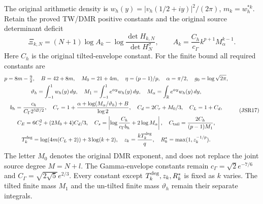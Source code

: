 \documentclass[11pt,a4paper]{article}
\newcommand{\R}{\mathbb R}
\begin{document}
The original arithmetic density is
$w_h(y)=|v_h(1/2+iy)|^2/(2\pi)$, $m_k=w_h^{*k}$.
Retain the proved TW/DMR positive constants and the original
source determinant deficit
\[
 \Xi_{k,N}=(N+1)\log A_k
       -\log\frac{\det H_{k,N}}{\det H_N^\sigma},\qquad
 A_k=\frac{C_h}{c_\Gamma}k^{p+1}M_\alpha^{k-1}.
 \tag{JSR16}
\]
Here $C_h$ is the original tilted-envelope constant. For the
finite bound all required constants are
\[
\begin{gathered}
 p=8m-\tfrac92,\quad B=42+8m,\quad M_0=21+4m,\quad
 \eta=(p-1)/p,\quad\alpha=\pi/2,\quad g_0=\log\sqrt{2\pi},\\
 \vartheta_h=\int_{-1}^1w_h(y)\,dy,\quad
 M_1=\int_{-1}^1e^{\alpha y}w_h(y)\,dy,\quad
 M_\alpha=\int_{\R}e^{\alpha y}w_h(y)\,dy,\\
 b_h=\frac{c_h}{C_\Gamma2^{3B/2}},\quad
 C_r=1+\frac{\alpha+\log(M_\alpha/\vartheta_h)+B}{\log2},\quad
 C_d=2C_r+M_0/3,\quad C_L=1+C_d,\\
 C_E=6C_r^2+(2M_0+4)C_d/3,\quad
 C_s=\left|\log\frac{C_h}{c_\Gamma b_h}+2\log M_\alpha\right|,
 \quad C_{\rm tail}=\frac{2C_h}{(p-1)M_1},\\
 T_k^{\rm deg}=\log(4m(C_L+2))+3\log(k+2),\quad
 z_k=\frac{kT_k^{\rm deg}}q,\quad R_k^*=\max(1,z_k^{-1/p}).
\end{gathered}\tag{JSR17}
\]
The letter $M_0$ denotes the original DMR exponent, and does
not replace the joint source degree $M=N+l$.
The Gamma-envelope constants remain
$c_\Gamma=\sqrt2e^{-7/6}$ and
$C_\Gamma=\sqrt{2\sqrt5}e^{2/3}$.
Every constant except $T_k^{\rm deg},z_k,R_k^*$ is fixed
as $k$ varies. The tilted finite mass $M_1$ and the
un-tilted finite mass $\vartheta_h$ remain their separate integrals.
\end{document}

